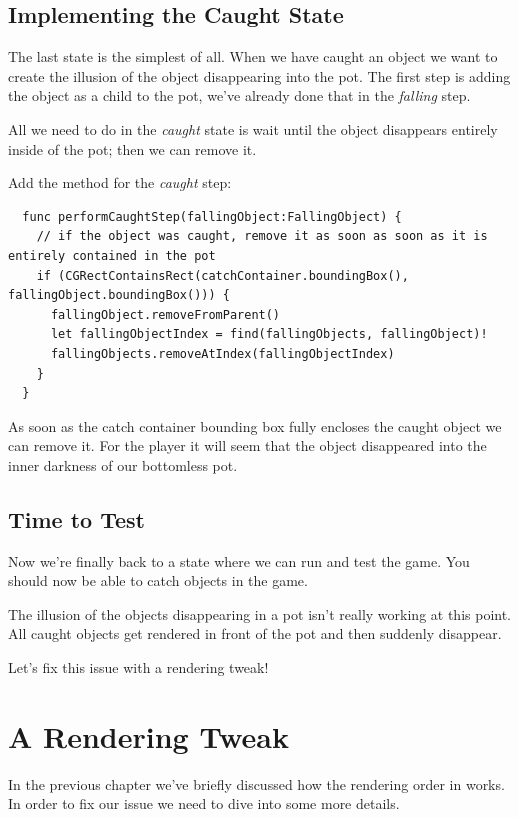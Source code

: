\subsection{Implementing the Caught State}
The last state is the simplest of all. When we have caught an object we want to
create the illusion of the object disappearing into the pot. The first step is
adding the object as a child to the pot, we've already done that in the
\textit{falling} step. 

All we need to do in the \textit{caught} state is wait until the object
disappears entirely inside of the pot; then we can remove it.

\begin{leftbar}
Add the method for the \textit{caught} step:
\begin{lstlisting}
  func performCaughtStep(fallingObject:FallingObject) {
    // if the object was caught, remove it as soon as soon as it is entirely contained in the pot
    if (CGRectContainsRect(catchContainer.boundingBox(), fallingObject.boundingBox())) {
      fallingObject.removeFromParent()
      let fallingObjectIndex = find(fallingObjects, fallingObject)!
      fallingObjects.removeAtIndex(fallingObjectIndex)
    }
  }
\end{lstlisting}
\end{leftbar}

As soon as the catch container bounding box fully encloses the caught object we
can remove it. For the player it will seem that the object disappeared into the
inner darkness of our bottomless pot.

\subsection{Time to Test}
Now we're finally back to a state where we can run and test the game. You should
now be able to catch objects in the game. 

The illusion of the objects disappearing in a pot isn't really working at this
point. All caught objects get rendered in front of the pot and then suddenly
disappear.

Let's fix this issue with a rendering tweak!

\section{A Rendering Tweak}\label{rendering_tweak}

In the previous chapter we've briefly discussed how the rendering order in
\cocos{} works. In order to fix our issue we need to dive into some more
details.

